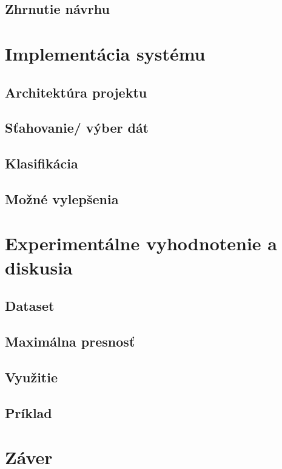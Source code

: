 \section{Zhrnutie návrhu}


\chapter{Implementácia systému}
\label{implementacia}

\section{Architektúra projektu}


\section{Sťahovanie/ výber dát}


\section{Klasifikácia}


\section{Možné vylepšenia}


\chapter{Experimentálne vyhodnotenie a diskusia}
\label{experimenty}


\section{Dataset}


\section{Maximálna presnosť}


\section{Využitie}


\section{Príklad}


\chapter{Záver}
\label{zaver}





